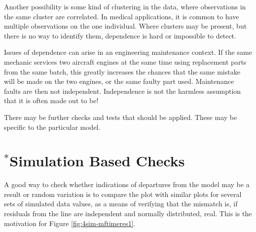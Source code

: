 \documentclass{tufte-book}\usepackage[]{graphicx}\usepackage[]{color}
\begin{document}
 Another possibility is some kind of clustering in the data, where
 observations in the same cluster are correlated. In medical
 applications, it is common to have multiple observations on the one
 individual.   Where clusters may be present, but there is no way to
 identify them, dependence is hard or impossible to detect.

 Issues of dependence can arise in an engineering maintenance context.
 If the same mechanic services two aircraft engines at the same time
 using replacement parts from the same batch, this greatly increases
 the chances that the same mistake will be made on the two engines, or
 the same faulty part used.  Maintenance faults are then not
 independent. Independence is not the harmless assumption that it is
 often made out to be!

There may be further checks and tests that should be applied.
These may be specific to the particular model.

\section{$^*$Simulation Based Checks}\label{sec:simcheck}

A good way to check whether indications of departures from the model
may be a result or random variation is to compare the plot with
similar plots for several sets of simulated data values, as a means
of verifying that the mismatch is, if residuals from the line are
independent and normally distributed, real. This is the motivation
for Figure \ref{fig:4sim-mftimeres1}. 
  
\end{document}
